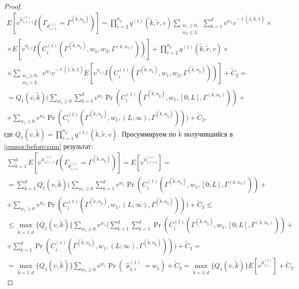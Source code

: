\begin{proof}
\begin{multline}
E[v^{\hat{\varkappa}_{1,i+1}^{(1)}} I(\Gamma_{\theta_{i+1}^{(1)}}= \Gamma^{(\tilde{k},n_{\tilde{k}})})]= \prod_{\tilde{r}=2}^{n_{\tilde{k}}} q^{(1)}(\tilde{k},\tilde{r},v) \sum_{\substack{w_1\geqslant 0, \\ w_3 \leqslant L}} \sum_{k=1}^d v^{w_1} v^{- \ell(1,\tilde{k},1)} \times \\ \times E[v^{ \eta_{1,\tau} } I( C_i^{(1)}(\Gamma^{(\tilde{k},n_{\tilde{k}})},w_1,w_3,\Gamma^{(k,n_k)} ))] +
\prod_{\tilde{r}=2}^{n_{\tilde{k}}} q^{(1)}(\tilde{k},\tilde{r},v)\times \\ \times \sum_{\substack{w_1\geqslant 0, \\ w_3 > L}} v^{w_1}v^{- \ell(1,\tilde{k},1)}  E[v^{ \eta_{1,\tau}} I( C_i^{(1)}(\Gamma^{(\tilde{k},n_{\tilde{k}})},w_1,w_3,\Gamma^{(\tilde{k},n_{\tilde{k}})} ))] + \widetilde{C}_2 = \\
  = Q_1(v,\tilde{k})  \biggl(\sum_{w_1\geqslant 0} \sum_{k=1}^d v^{w_1} \Pr(C_i^{(1)}(\Gamma^{(\tilde{k},n_{\tilde{k}})},w_1,[0;L],\Gamma^{(k,n_k)} )) + \\
   + \sum_{w_1\geqslant 0}  v^{w_1} \Pr(C_i^{(1)}(\Gamma^{(\tilde{k},n_{\tilde{k}})},w_1,(L;\infty),\Gamma^{(\tilde{k},n_{\tilde{k}})} ))\biggr) + \widetilde{C}_2,
   \label{censor:before:sum}
  \end{multline}
где $Q_1(v,\tilde{k})= \prod_{\tilde{r}=1}^{n_{\tilde{k}}} q^{(1)}(\tilde{k},\tilde{r},v) $. Просуммируем по $\tilde{k}$ получившийся в \eqref{censor:before:sum} результат:
\allowdisplaybreaks
\begin{multline*}
\sum_{\tilde{k}=1}^d E[v^{\hat{\varkappa}_{1,i+1}^{(1)}} I(\Gamma_{\theta_{i+1}^{(1)}}= \Gamma^{(\tilde{k},n_{\tilde{k}})})]=   E[v^{\hat{\varkappa}_{1,i+1}^{(1)}} ]=\\
  = \sum_{\tilde{k}=1}^d Q_1(v,\tilde{k})  \biggl(\sum_{w_1\geqslant 0} \sum_{k=1}^d v^{w_1} \Pr(C_i^{(1)}(\Gamma^{(\tilde{k},n_{\tilde{k}})},w_1,[0;L],\Gamma^{(k,n_k)} )) + \\
   + \sum_{w_1\geqslant 0}  v^{w_1} \Pr(C_i^{(1)}(\Gamma^{(\tilde{k},n_{\tilde{k}})},w_1,(L;\infty),\Gamma^{(\tilde{k},n_{\tilde{k}})} ))\biggr) + \widetilde{C}_3 \leqslant \\ \leqslant
   \max_{ \tilde{k}=\overline{1;d} }{\{Q_1(v,\tilde{k}) \}} \sum_{w_1\geqslant 0}  v^{w_1} \biggl(\sum_{\tilde{k}=1}^d \sum_{k=1}^d  \Pr(C_i^{(1)}(\Gamma^{(\tilde{k},n_{\tilde{k}})},w_1,[0;L],\Gamma^{(k,n_k)} )) + \\
   +  \sum_{\tilde{k}=1}^d \Pr(C_i^{(1)}(\Gamma^{(\tilde{k},n_{\tilde{k}})},w_1,(L;\infty),\Gamma^{(\tilde{k},n_{\tilde{k}})} ))\biggr) + \widetilde{C}_3 = \\
   =\max_{ \tilde{k}=\overline{1;d} }{\{Q_1(v,\tilde{k}) \}} \sum_{w_1\geqslant 0}  v^{w_1} \Pr(\hat{\varkappa}_{1,i}^{(1)}=w_1)+ \widetilde{C}_3=\max_{ \tilde{k}=\overline{1;d} }{\{Q_1(v,\tilde{k}) \}} E[v^{\hat{\varkappa}_{1,i}^{(1)}} ]+ \widetilde{C}_3.
  \end{multline*}


\end{proof}
